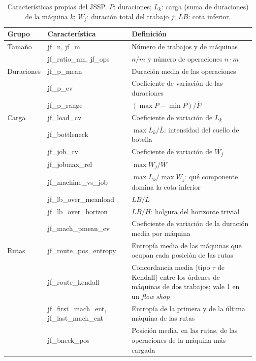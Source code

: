 \begin{table}[H]
  \centering
  \small
  \singlespacing
  \caption{Características propias del JSSP. $P$: duraciones; $L_k$: carga
  (suma de duraciones) de la máquina $k$; $W_j$: duración total del trabajo
  $j$; $LB$: cota inferior.}
  \label{tab:features_propias}
  \begin{tabularx}{\textwidth}{l >{\ttfamily\raggedright\arraybackslash}p{4.6cm} >{\raggedright\arraybackslash}X}
    \toprule
    \textbf{Grupo} & \normalfont\textbf{Característica} & \textbf{Definición} \\
    \midrule
    Tamaño & jf\_n, jf\_m & Número de trabajos y de máquinas \\
     & jf\_ratio\_nm, jf\_ops & $n/m$ y número de operaciones $n \cdot m$ \\
    \midrule
    Duraciones & jf\_p\_mean & Duración media de las operaciones \\
     & jf\_p\_cv & Coeficiente de variación de las duraciones \\
     & jf\_p\_range & $(\max P - \min P) / \overline{P}$ \\
    \midrule
    Carga & jf\_load\_cv & Coeficiente de variación de $L_k$ \\
     & jf\_bottleneck & $\max L_k / \overline{L}$: intensidad del cuello de botella \\
     & jf\_job\_cv & Coeficiente de variación de $W_j$ \\
     & jf\_jobmax\_rel & $\max W_j / \overline{W}$ \\
     & jf\_machine\_vs\_job & $\max L_k / \max W_j$: qué componente domina la cota inferior \\
     & jf\_lb\_over\_meanload & $LB / \overline{L}$ \\
     & jf\_lb\_over\_horizon & $LB / H$: holgura del horizonte trivial \\
     & jf\_mach\_pmean\_cv & Coeficiente de variación de la duración media por máquina \\
    \midrule
    Rutas & jf\_route\_pos\_entropy & Entropía media de las máquinas que ocupan cada posición de las rutas \\
     & jf\_route\_kendall & Concordancia media (tipo $\tau$ de Kendall) entre los órdenes de máquinas de dos trabajos; vale 1 en un \textit{flow shop} \\
     & jf\_first\_mach\_ent, jf\_last\_mach\_ent & Entropía de la primera y de la última máquina de las rutas \\
     & jf\_bneck\_pos & Posición media, en las rutas, de las operaciones de la máquina más cargada \\
    \bottomrule
  \end{tabularx}
\end{table}

